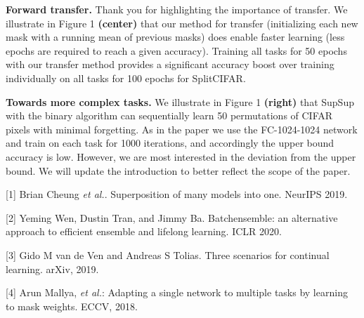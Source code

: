 \documentclass{article}
\begin{document}
\textbf{Forward transfer.} Thank you for highlighting the importance of transfer. We illustrate in Figure 1 \textbf{(center)} that our method for transfer (initializing each new mask with a running mean of previous masks) does enable faster learning (less epochs are required to reach a given accuracy). Training all tasks for 50 epochs with our transfer method provides a significant accuracy boost over training individually on all tasks for 100 epochs for SplitCIFAR.

\textbf{Towards more complex tasks.}  We illustrate in Figure 1 \textbf{(right)} that SupSup with the binary algorithm can sequentially learn 50 permutations of CIFAR pixels with minimal forgetting. As in the paper we use the FC-1024-1024 network and train on each task for 1000 iterations, and accordingly the upper bound accuracy is low. However, we are most interested in the deviation from the upper bound. We will update the introduction to better reflect the scope of the paper.

{\small
[1] Brian Cheung \textit{et al.}. Superposition of many models into one. NeurIPS 2019.

[2] Yeming Wen, Dustin Tran, and Jimmy Ba. Batchensemble: an alternative approach to efficient ensemble and lifelong learning. ICLR 2020.

[3] Gido M van de Ven and Andreas S Tolias. Three scenarios for continual learning.
arXiv, 2019.

[4] Arun Mallya, \textit{et al.}: Adapting a single network to
multiple tasks by learning to mask weights. ECCV, 2018. 
}
\end{document}
